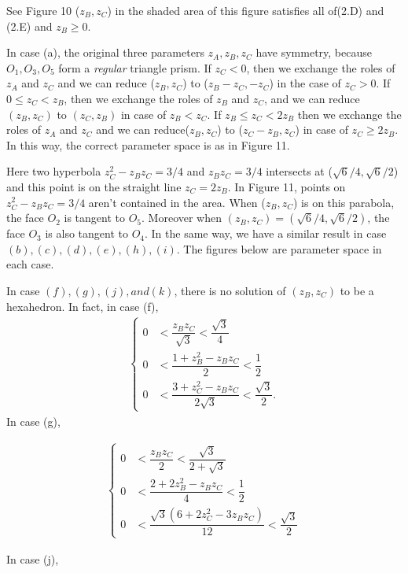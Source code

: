 \documentclass[suppldata, dvipdfmx]{interact}
\theoremstyle{plain}%
\theoremstyle{definition}
\theoremstyle{remark}
\theoremstyle{problemstyle}
\begin{document}
See Figure 10 ($z_B, z_C$) in the shaded area of this figure satisfies
all of(2.D) and (2.E) and $z_B \geq 0$.

In case (a), the original three parameters $z_A, z_B, z_C$ have symmetry,
because $O_1, O_3, O_5$ form a \textit{regular} triangle prism.
If $z_C < 0$, then we exchange the roles of $z_A$ and $z_C$ and we can reduce
($z_B, z_C$) to ($z_B - z_C, -z_C$) in the case of $z_C > 0$.
If $0 \leq z_C < z_B$, then we exchange the roles of $z_B$ and $z_C$, 
and we can reduce $(z_B, z_C)$ to $(z_C, z_B)$ in case of 
$z_B < z_C$. If $z_B \leq z_C < 2z_B$ then we exchange the roles of
$z_A$ and $z_C$ and we can reduce($z_B, z_C$) to ($z_C-z_B,z_C$) in case
of $z_C \geq 2z_B$. In this way, the correct parameter space is as in
Figure 11.

Here two hyperbola $z^2_C - z_Bz_C = 3/4$ and $z_B z_C = 3/4$ intersects
at ($\sqrt{6} / 4, \sqrt{6}/2$) and this point is on the straight line
$z_C=2z_B$. In Figure 11, points on $z^2_C - z_Bz_C = 3/4$ aren't
contained in the area. When ($z_B, z_C$) is on this parabola, the face
$O_2$ is tangent to $O_5$. Moreover when
$(z_B, z_C) = (\sqrt{6} / 4, \sqrt{6}/2)$, the face $O_3$ is also tangent
to $O_4$.
In the same way, we have a similar result in case $(b), (c), (d), (e),
(h), (i)$. The figures below are parameter space in each case.

In case $(f), (g), (j), and (k)$, there is no solution of $(z_B, z_C)$
to be a hexahedron. In fact, in case (f),
\begin{align*}
\begin{cases}
 0 &< \dfrac{z_Bz_C}{\sqrt{3}} < \dfrac{\sqrt{3}}{4} \\
 0 &< \dfrac{1 + z^2_B - z_Bz_C}{2} < \dfrac{1}{2} \\
 0 &< \dfrac{3 + z^2_C - z_Bz_C}{2\sqrt{3}} < \dfrac{\sqrt{3}}{2}.
\end{cases}
\end{align*}
In case (g),

\begin{align*}
\begin{cases}
0 &< \dfrac{z_Bz_C}{2} < \dfrac{\sqrt{3}}{2 + \sqrt{3}} \\
0 &< \dfrac{2 + 2z^2_B - z_Bz_C}{4} < \dfrac{1}{2} \\
0 &< \dfrac{\sqrt{3}(6 + 2z^2_C - 3z_Bz_C)}{12} < \dfrac{\sqrt{3}}{2}
\end{cases}
\end{align*}

In case (j),
\end{document}
